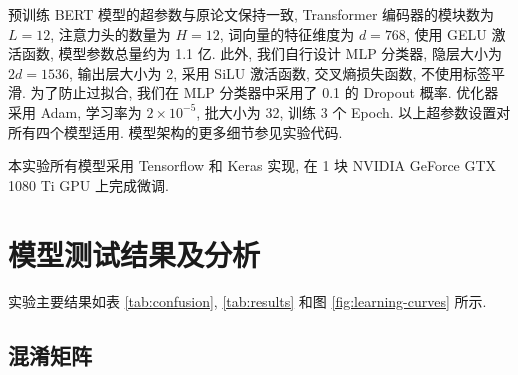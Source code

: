 \documentclass[12pt,a4paper]{article}
\begin{document}
预训练 BERT 模型的超参数与原论文保持一致, Transformer 编码器的模块数为 $L = 12$, 注意力头的数量为 $H = 12$, 词向量的特征维度为 $d = 768$, 使用 GELU 激活函数, 模型参数总量约为 1.1 亿. 此外, 我们自行设计 MLP 分类器, 隐层大小为 $2d = 1536$, 输出层大小为 2, 采用 SiLU 激活函数, 交叉熵损失函数, 不使用标签平滑. 为了防止过拟合, 我们在 MLP 分类器中采用了 0.1 的 Dropout 概率. 优化器采用 Adam, 学习率为 $2\times 10^{-5}$, 批大小为 32, 训练 3 个 Epoch. 以上超参数设置对所有四个模型适用. 模型架构的更多细节参见实验代码.

本实验所有模型采用 Tensorflow 和 Keras 实现, 在 1 块 NVIDIA GeForce GTX 1080 Ti GPU 上完成微调.

\section{模型测试结果及分析}

实验主要结果如表 \ref{tab:confusion}, \ref{tab:results} 和图 \ref{fig:learning-curves} 所示.

\subsection{混淆矩阵}
\end{document}
